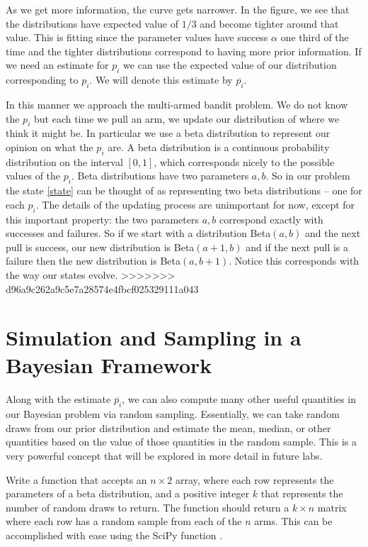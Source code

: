 As we get more information, the curve gets narrower.  
In the figure, we see that the distributions have expected 
value of $1/3$ and become tighter around that value.  
This is fitting since the parameter values have success $\alpha$ one 
third of the time and the tighter distributions correspond to having 
more prior information.  If we need an estimate for $p_i$ we can use 
the expected value of our distribution corresponding to $p_i$.  
We will denote this estimate by $\overline{p_i}$.

In this manner we approach the multi-armed bandit problem.  
We do not know the $p_i$ but each time we pull an arm, we update our distribution of where we think it might be.  
In particular we use a beta distribution to represent our opinion on what the $p_i$ are.  
A beta distribution is a continuous probability distribution on the interval $[0,1]$, 
which corresponds nicely to the possible values of the $p_i$.  Beta distributions have two parameters $a,b$.  
So in our problem the state \eqref{state} can be thought of as representing two beta distributions -- one for each $p_i$. 
The details of the updating process are unimportant for now, except 
for this important property: the two parameters $a,b$ correspond exactly with successes and failures.  
So if we start with a distribution Beta$(a,b)$ and the next pull is success, our new distribution is 
Beta$(a+1,b)$ and if the next pull is a failure then the new distribution is Beta$(a,b+1)$.  
Notice this corresponds with the way our states evolve.
>>>>>>> d96a9c262a9c5e7a28574e4fbcf025329111a043

\section*{Simulation and Sampling in a Bayesian Framework}
Along with the estimate $\overline{p_i}$, we can also compute many other useful 
quantities in our Bayesian problem via random sampling.  Essentially, we can take 
random draws from our prior distribution and estimate the mean, median, or other 
quantities based on the value of those quantities in the random sample.  
This is a very powerful concept that will be explored in more detail in future labs.

\begin{problem}
Write a function  that accepts an $n\times 2$ array, where each 
row represents the parameters of a beta distribution, and a positive integer $k$ 
that represents the number of random draws to return.  
The function should return a $k\times n$ matrix where each row has a random sample
from each of the $n$ arms.  This can be accomplished with ease using the SciPy function
.
\label{prob:simdata}
\end{problem}

